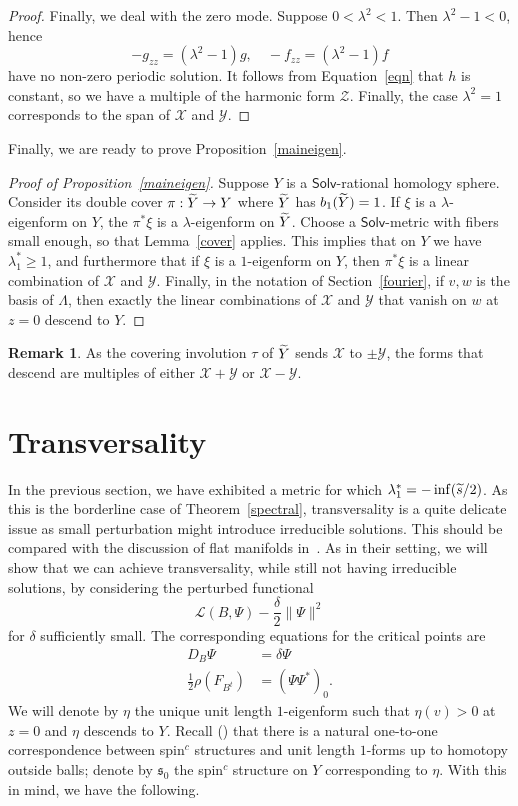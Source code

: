 \documentclass[11pt]{article}
\theoremstyle{definition}
\newtheorem{rema}[theo]{Remark}
\numberwithin{equation}{section}
\numberwithin{figure}{section}
\numberwithin{table}{section}
\newcommand{\Solv}{\mathsf{Solv}}
\newcommand{\Y}{\mathcal{Y}}
\newcommand{\X}{\mathcal{X}}
\newcommand{\Z}{\mathcal{Z}}
\newcommand{\spin}{\mathfrak{s}}
\let\oldtilde\tilde
\renewcommand*{\tilde}[1]{\mathchoice{\widetilde{#1}}{\widetilde{#1}}{\oldtilde{#1}}{\oldtilde{#1}}}\let\oldhat\hat
\renewcommand*{\hat}[1]{\mathchoice{\widehat{#1}}{\widehat{#1}}{\oldhat{#1}}{\oldhat{#1}}}
\begin{document}
\begin{proof}
Finally, we deal with the zero mode. Suppose $0<\lambda^2< 1$. Then $\lambda^2-1<0$, hence
\[
-g_{zz}=\left(\lambda^2-1\right)g,\quad -f_{zz}=\left(\lambda^2-1\right)f
\]
have no non-zero periodic solution. It follows from Equation~\eqref{eqn} that $h$ is constant, so we have a multiple of the harmonic form $\Z$. Finally, the case $\lambda^2=1$ corresponds to the span of $\X$ and $\Y$.
\end{proof}

Finally, we are ready to prove Proposition~\ref{maineigen}.
\begin{proof}[Proof of Proposition~\ref{maineigen}]
Suppose $Y$ is a $\Solv$-rational homology sphere. Consider its double cover $\pi:\tilde{Y}\rightarrow Y$ where $\tilde{Y}$ has $b_1(\tilde{Y})=1$. If $\xi$ is a $\lambda$-eigenform on $Y$, the $\pi^*\xi$ is a $\lambda$-eigenform on $\tilde{Y}$. Choose a $\Solv$-metric with fibers small enough, so that Lemma~\ref{cover} applies. This implies that on $Y$ we have $\lambda_1^*\geq1$, and furthermore that if $\xi$ is a $1$-eigenform on $Y$, then $\pi^*\xi$ is a linear combination of $\X$ and $\Y$. Finally, in the notation of Section~\ref{fourier}, if $v,w$ is the basis of $\Lambda$, then exactly the linear combinations of $\X$ and $\Y$ that vanish on $w$ at $z=0$ descend to $Y$.
\end{proof}


\begin{rema}
As the covering involution $\tau$ of $\tilde{Y}$ sends $\X$ to $\pm \Y$, the forms that descend are multiples of either $\X+\Y$ or $\X-\Y$.
\end{rema}


\section{Transversality}\label{trans}
In the previous section, we have exhibited a metric for which $\lambda_1^*=-\inf (\tilde{s}/2)$. As this is the borderline case of Theorem~\ref{spectral}, transversality is a quite delicate issue as small perturbation might introduce irreducible solutions. This should be compared with the discussion of flat manifolds in~\cite[Chapter~37]{KM}. As in their setting, we will show that we can achieve transversality, while still not having irreducible solutions, by considering the perturbed functional
\[
\mathcal{L}(B,\Psi)-\frac{\delta}{2}\|\Psi\|^2
\]
for $\delta$ sufficiently small. The corresponding equations for the critical points are
\begin{align*}
D_B\Psi&=\delta\Psi\\
\frac{1}{2}\rho(F_{B^t})&=(\Psi\Psi^*)_0.
\end{align*}
We will denote by $\eta$ the unique unit length $1$-eigenform such that $\eta(v)>0$ at $z=0$ and $\eta$ descends to $Y$. Recall (\cite[Lemma~1.4]{Tur}) that there is a natural one-to-one correspondence between spin$^c$ structures and unit length $1$-forms up to homotopy outside balls; denote by $\spin_0$ the spin$^c$ structure on $Y$ corresponding to $\eta$. With this in mind, we have the following.
\end{document}
